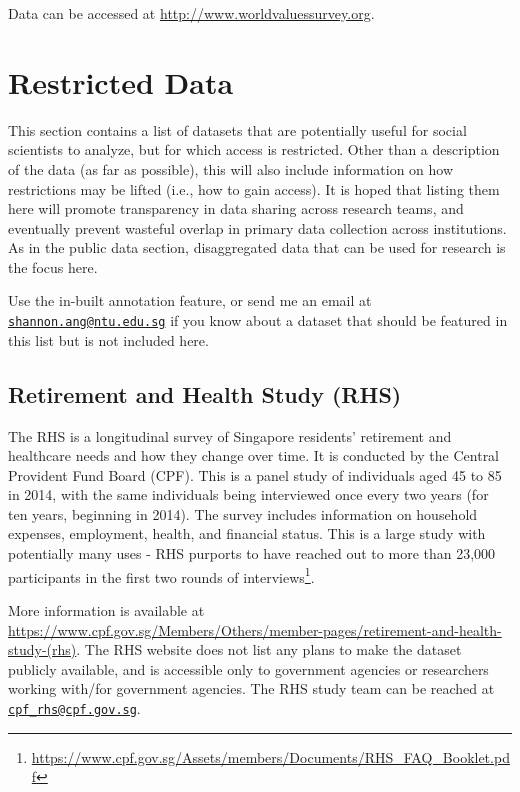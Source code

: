 \documentclass[openany]{book}
\let\rmarkdownfootnote\footnote%
\def\footnote{\protect\rmarkdownfootnote}
\begin{document}
Data can be accessed at \url{http://www.worldvaluessurvey.org}.

\chapter{Restricted Data}\label{restricteddata}

This section contains a list of datasets that are potentially useful for
social scientists to analyze, but for which access is restricted. Other
than a description of the data (as far as possible), this will also
include information on how restrictions may be lifted (i.e., how to gain
access). It is hoped that listing them here will promote transparency in
data sharing across research teams, and eventually prevent wasteful
overlap in primary data collection across institutions. As in the public
data section, disaggregated data that can be used for research is the
focus here.

Use the in-built annotation feature, or send me an email at
\href{mailto:shannon.ang@ntu.edu.sg}{\nolinkurl{shannon.ang@ntu.edu.sg}}
if you know about a dataset that should be featured in this list but is
not included here.

\section{Retirement and Health Study (RHS)}\label{rhs}

The RHS is a longitudinal survey of Singapore residents' retirement and
healthcare needs and how they change over time. It is conducted by the
Central Provident Fund Board (CPF). This is a panel study of individuals
aged 45 to 85 in 2014, with the same individuals being interviewed once
every two years (for ten years, beginning in 2014). The survey includes
information on household expenses, employment, health, and financial
status. This is a large study with potentially many uses - RHS purports
to have reached out to more than 23,000 participants in the first two
rounds of interviews\footnote{\url{https://www.cpf.gov.sg/Assets/members/Documents/RHS_FAQ_Booklet.pdf}}.

More information is available at
\url{https://www.cpf.gov.sg/Members/Others/member-pages/retirement-and-health-study-(rhs)}.
The RHS website does not list any plans to make the dataset publicly
available, and is accessible only to government agencies or researchers
working with/for government agencies. The RHS study team can be reached
at \href{mailto:cpf_rhs@cpf.gov.sg}{\nolinkurl{cpf\_rhs@cpf.gov.sg}}.
\end{document}
